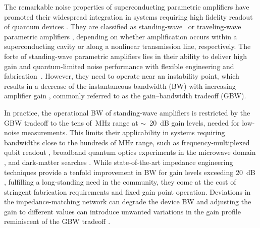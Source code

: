 \documentclass[%
reprint,
floatfix,
superscriptaddress,
amsmath,amssymb,
aps,
pra,
]{revtex4-2}
\begin{document}


\maketitle


The remarkable noise properties of superconducting parametric amplifiers have promoted their widespread integration in systems requiring high fidelity readout of quantum devices \cite{Vijay2011Mar,Roy2016Aug,Aumentado2020Jul}. They are classified as standing-wave~\cite{Roy2016Aug,Aumentado2020Jul} or traveling-wave parametric amplifiers \cite{HoEom2012Aug,Macklin2015Sep,Malnou2021Jan,Esposito2021Sep}, depending on whether amplification occurs within a superconducting cavity or along a nonlinear transmission line, respectively. The forte of standing-wave parametric amplifiers lies in their ability to deliver high gain and quantum-limited noise performance with flexible engineering and fabrication~\cite{Aumentado2020Jul,Sivak2020,Winkel2020DJA,Xu2023Feb,Kaufman2025Jul}. However, they need to operate near an instability point, which results in a decrease of the instantaneous bandwidth (BW) with increasing amplifier gain \cite{Roy2016Aug,Clerk2010Apr}, commonly referred to as the gain–bandwidth tradeoff (GBW). 

In practice, the operational BW of standing-wave amplifiers is restricted by the GBW tradeoff to the tens of~MHz range at $\sim$~20~dB gain levels, needed for low-noise measurements. This limits their applicability in systems requiring bandwidths close to the hundreds of MHz range, such as frequency-multiplexed qubit readout \cite{Heinsoo2018Sep,Krinner2022May,White2023Jan,BibEntry2023Feb}, broadband quantum optics experiments in the microwave domain \cite{Esposito2022Apr,Agusti2022Jun,Qiu2023May}, and dark-matter searches \cite{Lamoreaux2013Aug,Backes2021Feb,Braggio2022Sep}.
While state-of-the-art impedance engineering techniques provide a tenfold improvement in BW for gain levels exceeding 20~dB \cite{Mutus2014Jun,Roy2015Dec,Naaman2022May,Grebel2021Apr,Ezenkova2022Dec,Kaufman2023Nov,Zhou2025Mar,Hung2025Apr,Joshi2025Oct}, fulfilling a long-standing need in the community, they come at the cost of stringent fabrication requirements and fixed gain point operation. Deviations in the impedance-matching network can degrade the device BW and adjusting the gain to different values can introduce unwanted variations in the gain profile reminiscent of the GBW tradeoff \cite{Mutus2014Jun,Ezenkova2022Dec,Zhou2025Mar}. 
\end{document}
